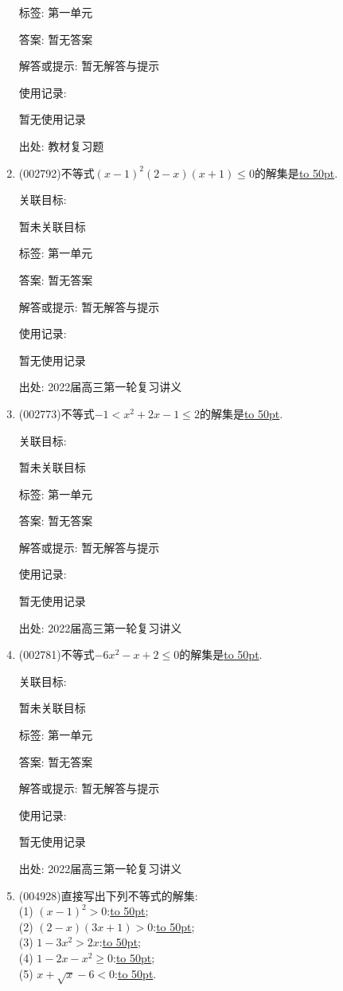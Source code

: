 \documentclass[10pt,a4paper]{article}
\newcommand{\blank}[1]{\underline{\hbox to #1pt{}}}
\begin{document}
\begin{enumerate}[1.]
标签: 第一单元

答案: 暂无答案

解答或提示: 暂无解答与提示

使用记录:

暂无使用记录


出处: 教材复习题
\item { (002792)}不等式$(x-1)^2(2-x)(x+1)\le 0$的解集是\blank{50}.


关联目标:

暂未关联目标



标签: 第一单元

答案: 暂无答案

解答或提示: 暂无解答与提示

使用记录:

暂无使用记录


出处: 2022届高三第一轮复习讲义
\item { (002773)}不等式$-1<x^2+2x-1\le 2$的解集是\blank{50}.


关联目标:

暂未关联目标



标签: 第一单元

答案: 暂无答案

解答或提示: 暂无解答与提示

使用记录:

暂无使用记录


出处: 2022届高三第一轮复习讲义
\item { (002781)}不等式$-6x^2-x+2\le 0$的解集是\blank{50}.


关联目标:

暂未关联目标



标签: 第一单元

答案: 暂无答案

解答或提示: 暂无解答与提示

使用记录:

暂无使用记录


出处: 2022届高三第一轮复习讲义
\item { (004928)}直接写出下列不等式的解集:\\
(1) $(x-1)^2>0$:\blank{50};\\
(2) $(2-x)(3x+1)>0$:\blank{50};\\
(3) $1-3x^2>2x$:\blank{50};\\
(4) $1-2x-x^2\ge 0$:\blank{50};\\
(5) $x+\sqrt x-6<0$:\blank{50}.



\end{enumerate}
\end{document}
